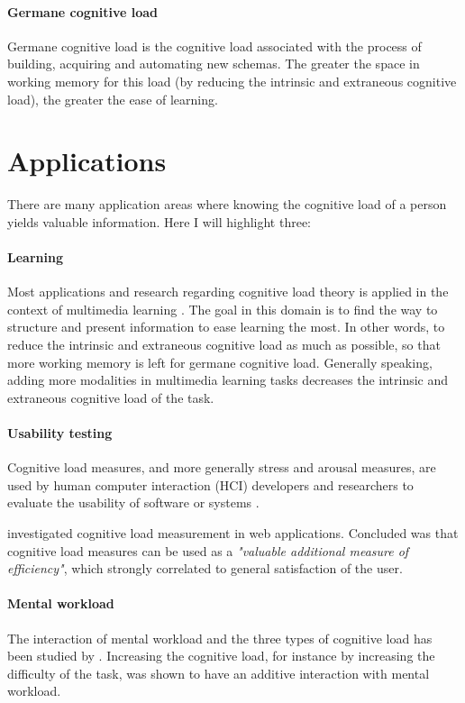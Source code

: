 \documentclass[11pt,leqno,a4paper]{report} %
\begin{document}
\paragraph{Germane cognitive load}
Germane cognitive load is the cognitive load associated with the process of building, acquiring and automating new schemas. The greater the space in working memory for this load (by reducing the intrinsic and extraneous cognitive load), the greater the ease of learning.

\section{Applications}
There are many application areas where knowing the cognitive load of a person yields valuable information. Here I will highlight three:

\paragraph{Learning}
Most applications and research regarding cognitive load theory is applied in the context of multimedia learning \citep{brunken2003direct}. The goal in this domain is to find the way to structure and present information to ease learning the most. In other words, to reduce the intrinsic and extraneous cognitive load as much as possible, so that more working memory is left for germane cognitive load. Generally speaking, adding more modalities in multimedia learning tasks decreases the intrinsic and extraneous cognitive load of the task.

\paragraph{Usability testing}
Cognitive load measures, and more generally stress and arousal measures, are used by human computer interaction (HCI) developers and researchers to evaluate the usability of software or systems \citep{Jacob2003} \citep{Schmutz2009}.

\citet{Schmutz2009} investigated cognitive load measurement in web applications. Concluded was that cognitive load measures can be used as a \textit{"valuable additional measure of efficiency"}, which strongly correlated to general satisfaction of the user. 

\paragraph{Mental workload}
The interaction of mental workload and the three types of cognitive load has been studied by \citet{Galy2012269}. Increasing the cognitive load, for instance by increasing the difficulty of the task, was shown to have an additive interaction with mental workload.
\end{document}
